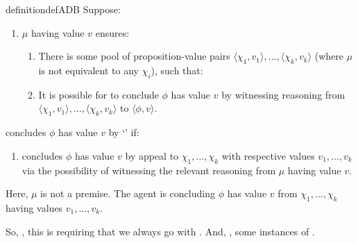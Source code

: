 \begin{note}
  \begin{restatable}[\adB{}]{definition}{defADB}
    \label{AR:adB}
    \label{def:adB}
    Suppose:
    \begin{enumerate}[label=\textsf{I:\arabic*}., ref=(\textsf{I}:\arabic*), series=adB_counter]
    \item
      \label{def:adB:poss}
      \(\mu\) having value \(v\) ensures:
      \begin{enumerate}
      \item
        There is some pool of proposition-value pairs \(\langle \chi_{1},v_{1} \rangle,\dots,\langle \chi_{k},v_{k} \rangle\) (where \(\mu\) is not equivalent to any \(\chi_{i}\)), such that:
      \item
        It is possible for \vAgent{} to conclude \(\phi\) has value \(v\) by witnessing reasoning from \(\langle \chi_{1},v_{1} \rangle,\dots,\langle \chi_{k},v_{k} \rangle\) to \(\langle \phi,v \rangle\).
      \end{enumerate}
    \end{enumerate}
    \vAgent{} concludes \(\phi\) has value \(v\) by `\adB{}' if:
    \begin{enumerate}[label=\textsf{I}:\arabic*., ref=(\textsf{I}:\arabic*), resume*=adB_counter]
    \item
      \label{def:adB:inter}
      \vAgent{} concludes \(\phi\) has value \(v\) by appeal to \(\chi_{1},\dots,\chi_{k}\) with respective values \(v_{1},\dots,v_{k}\) via the possibility of witnessing the relevant reasoning from \(\mu\) having value \(v\).
    \end{enumerate}
    \vspace{-\baselineskip}
  \end{restatable}

  Here, \(\mu\) is not a premise.
  The agent is concluding \(\phi\) has value \(v\) from \(\chi_{1},\dots,\chi_{k}\) having values \(v_{1},\dots,v_{k}\).
\end{note}

\begin{note}
  So, \ESU{}, this is requiring that we always go with \adA{}.
  And, \EAS{}, some instances of \adB{}.
\end{note}

